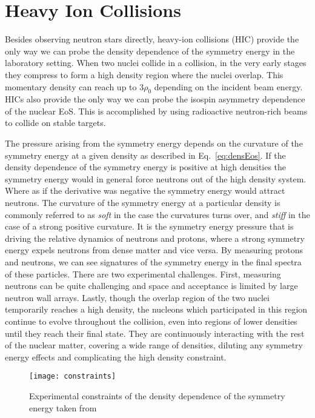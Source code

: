 \section{Heavy Ion Collisions}
Besides observing neutron stars directly, heavy-ion collisions (HIC) provide the only way we can probe the density dependence of the symmetry energy in the laboratory setting. When two nuclei collide in a collision, in the very early stages they compress to form a high density region where the nuclei overlap. This momentary density can reach up to $3\rho_0$ depending on the incident beam energy. HICs also provide the only way we can probe the isospin asymmetry dependence of the nuclear EoS. This is accomplished by using radioactive neutron-rich beams to collide on stable targets. 

The pressure arising from the symmetry energy depends on the curvature of the symmetry energy at a given density as described in Eq.~\ref{eq:densEos}. If the density dependence of the symmetry energy is positive at high densities the symmetry energy would in general force neutrons out of the high density system. Where as if the derivative was negative the symmetry energy would attract neutrons. The curvature of the symmetry energy at a particular density is commonly referred to as \emph{soft} in the case the curvatures turns over, and \emph{stiff} in the case of a strong positive curvature. It is the symmetry energy pressure that is driving the relative dynamics of neutrons and protons, where a strong symmetry energy expels neutrons from dense matter and vice versa. By measuring protons and neutrons, we can see signatures of the symmetry energy in the final spectra of these particles. There are two experimental challenges. First,  measuring neutrons can be quite challenging and space and acceptance is limited by large neutron wall arrays. Lastly, though the overlap region of the two nuclei temporarily reaches a high density, the nucleons which participated in this region continue to evolve throughout the collision, even into regions of lower densities until they reach their final state. They are continuously interacting with the rest of the nuclear matter, covering a wide range of densities, diluting any symmetry energy effects and complicating the high density constraint.   


\begin{figure}[!htb]
\centering
\texttt{[image: constraints]}
\caption{Experimental constraints of the density dependence of the symmetry energy taken from \cite{awayforward}}
\label{fig:symDen}
\end{figure}


